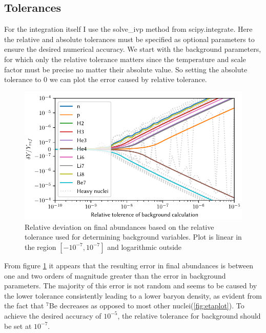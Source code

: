 \subsection{Tolerances}
For the integration itself I use the solve\_ivp method from scipy.integrate\cite{SciPy}. Here the relative and absolute tolerances must be specified as optional parameters to ensure the desired numerical accuracy. We start with the background parameters, for which only the relative tolerance matters since the temperature and scale factor must be precise no matter their absolute value. So setting the absolute tolerance to 0 we can plot the error caused by relative tolerance.
\begin{figure}[ht]
    \includegraphics[width=5.1in]{figures/rtolbackground.pdf}
    \caption{Relative deviation on final abundances based on the relative tolerance used for determining background variables. Plot is linear in the region $[-10^{-7},10^{-7}]$ and logarithmic outside}
    \label{fig:rtolbackground}
\end{figure}
From figure \ref{fig:rtolbackground} it appears that the resulting error in final abundances is between one and two orders of magnitude greater than the error in background parameters. The majority of this error is not random and seems to be caused by the lower tolerance consistently leading to a lower baryon density, as evident from the fact that ${}^{7}$Be decreases as opposed to most other nuclei(\cref{fig:etaplot}). To achieve the desired accuracy of $10^{-5}$, the relative tolerance for background should be set at $10^{-7}$.


